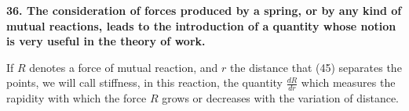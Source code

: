\documentclass{book}
\begin{document}
\vspace{4mm}
\textbf{36. The consideration of forces produced by a spring, or by any kind of mutual reactions, leads to the introduction of a quantity whose notion is very useful in the theory of work.}
\vspace{4mm} 



If \( R \) denotes a force of mutual reaction, and \( r \) the distance that
\newpage
(45)
separates the points, we will call stiffness, in this reaction, the quantity \( \frac{dR}{dr} \) which measures the rapidity with which the force \( R \) grows or decreases with the variation of distance.






\backmatter
{}
\printindex
\end{document}

